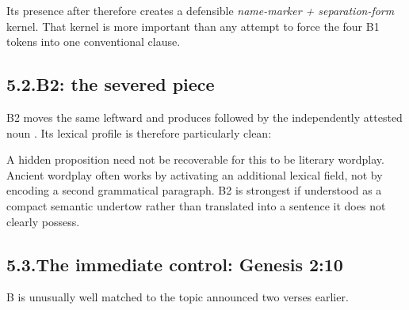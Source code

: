 Its presence after  therefore creates a defensible \emph{name-marker + separation-form} kernel.  That kernel is more important than any attempt to force the four B1 tokens into one conventional clause.

\subsection*{5.2.\quad B2: the severed piece}

B2 moves the same  leftward and produces  followed by the independently attested noun .  Its lexical profile is therefore particularly clean:


A hidden proposition need not be recoverable for this to be literary wordplay.  Ancient wordplay often works by activating an additional lexical field, not by encoding a second grammatical paragraph.  B2 is strongest if understood as a compact semantic undertow rather than translated into a sentence it does not clearly possess.

\subsection*{5.3.\quad The immediate control: Genesis 2:10}

B is unusually well matched to the topic announced two verses earlier.


